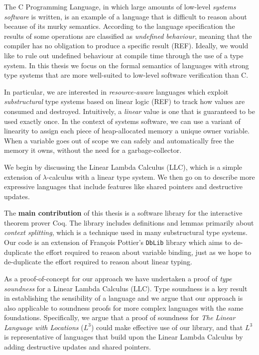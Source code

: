 \documentclass[]{unswthesis}
\newcommand{\Francois}{Fran\frenchc{c}ois }
\let\frenchc\c
\let\c\texttt
\let\i\textit
\let\b\textbf
\begin{document}
The C Programming Language, in which large amounts of low-level \i{systems software} is written, is an example of a language that is difficult to reason about because of its murky semantics. According to the language specification the results of some operations are classified as \i{undefined behaviour}, meaning that the compiler has no obligation to produce a specific result (REF). Ideally, we would like to rule out undefined behaviour at compile time through the use of a type system. In this thesis we focus on the formal semantics of languages with strong type systems that are more well-suited to low-level software verification than C.

In particular, we are interested in \i{resource-aware} languages which exploit \i{substructural} type systems based on linear logic (REF) to track how values are consumed and destroyed. Intuitively, a \i{linear} value is one that is guaranteed to be used exactly once. In the context of systems software, we can use a variant of linearity to assign each piece of heap-allocated memory a unique owner variable. When a variable goes out of scope we can safely and automatically free the memory it owns, without the need for a garbage-collector.

We begin by discussing the Linear Lambda Calculus (LLC), which is a simple extension of $\lambda$-calculus with a linear type system. We then go on to describe more expressive languages that include features like shared pointers and destructive updates.

The \b{main contribution} of this thesis is a software library for the interactive theorem prover Coq. The library includes definitions and lemmas primarily about \i{context splitting}, which is a technique used in many substructural type systems. Our code is an extension of \Francois Pottier's \c{DbLib} library which aims to de-duplicate the effort required to reason about variable binding, just as we hope to de-duplicate the effort required to reason about linear typing.

As a proof-of-concept for our approach we have undertaken a proof of \i{type soundness} for a Linear Lambda Calculus (LLC). Type soundness is a key result in establishing the sensibility of a language and we argue that our approach is also applicable to soundness proofs for more complex languages with the same foundations. Specifically, we argue that a proof of soundness for \i{The Linear Language with Locations} ($L^3$) could make effective use of our library, and that $L^3$ is representative of languages that build upon the Linear Lambda Calculus by adding destructive updates and shared pointers.
\end{document}
